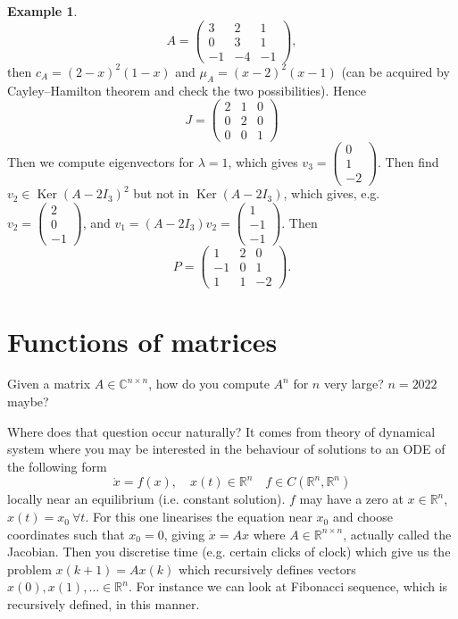 \documentclass[a4paper]{article}
\newcommand{\Ker}{\operatorname{Ker}}
\theoremstyle{definition}
\newtheorem{example}[defn]{Example}
\begin{document}
\begin{example}
\[
A=\begin{pmatrix}
3&2&1\\0&3&1\\-1&-4&-1
\end{pmatrix},
\]
then $c_{A}=(2-x)^2(1-x)$ and $\mu_{A}=(x-2)^2 (x-1)$ (can be acquired by Cayley--Hamilton theorem and check the two possibilities). Hence
\[
J=\begin{pmatrix}
2&1&0\\0&2&0\\0&0&1
\end{pmatrix}
\]
Then we compute eigenvectors for $\lambda=1$, which gives $v_3=\begin{pmatrix}0\\1\\-2\end{pmatrix}$. Then find $v_2\in \Ker (A-2I_3)^2$ but not in $\Ker (A-2I_3)$, which gives, e.g. $v_2=\begin{pmatrix}2\\0\\-1\end{pmatrix}$, and $v_1=(A-2I_3)v_2=\begin{pmatrix}1\\-1\\-1\end{pmatrix}$. Then
\[
P=\begin{pmatrix}
1&2&0\\-1&0&1\\1&1&-2
\end{pmatrix} .
\]
\end{example}

\section{Functions of matrices}
Given a matrix $A\in \mathbb C^{n\times n}$, how do you compute $A^n$ for $n$ very large? $n=2022$ maybe?

Where does that question occur naturally? It comes from theory of dynamical system where you may be interested in the behaviour of solutions to an ODE of the following form
\[
\dot x = f(x), \quad x(t) \in \mathbb R^n \quad f\in C (\mathbb R^n,\mathbb R^n)
\]
locally near an equilibrium (i.e. constant solution). $f$ may have a zero at $x\in \mathbb R^n$, $x(t)=x_0\ \forall t$. For this one linearises the equation near $x_0$ and choose coordinates such that $x_0=0$, giving $\dot x = Ax$ where $A\in \mathbb R^{n\times n}$, actually called the Jacobian. Then you discretise time (e.g. certain clicks of clock) which give us the problem $x(k+1)=Ax(k)$ which recursively defines vectors $x(0),x(1),\ldots \in \mathbb R^n$. For instance we can look at Fibonacci sequence, which is recursively defined, in this manner.
\end{document}

